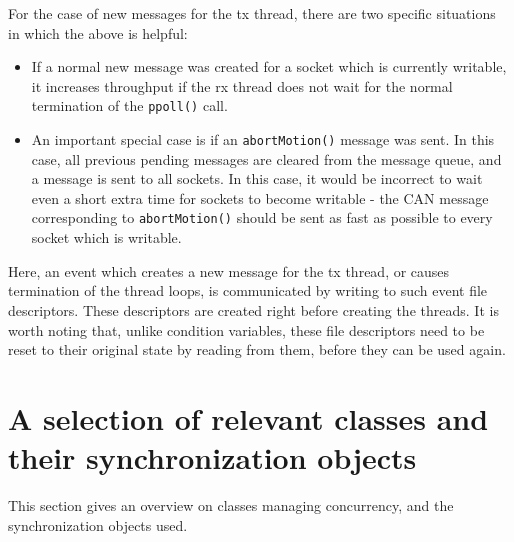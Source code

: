\documentclass[fontsize=12,a4paper]{scrartcl}
\begin{document}
For the case of new messages for the tx thread, there are two specific
situations in which the above is helpful:

\begin{itemize}
\item If a normal new message was created for a socket which is
  currently writable, it increases throughput if the rx thread does
  not wait for the normal termination of the \texttt{ppoll()} call.
  
\item An important special case is if an \texttt{abortMotion()}
  message was sent. In this case, all previous pending messages are
  cleared from the message queue, and a message is sent to all
  sockets. In this case, it would be incorrect to wait even a short
  extra time for sockets to become writable - the CAN message
  corresponding to \texttt{abortMotion()} should be sent as fast as
  possible to every socket which is writable.
  
\end{itemize}

Here, an event which creates a new message for the tx thread, or
causes termination of the thread loops, is communicated by writing to
such event file descriptors. These descriptors are created right
before creating the threads. It is worth noting that, unlike condition
variables, these file descriptors need to be reset to their original
state by reading from them, before they can be used again.

\section{A selection of relevant classes and their synchronization objects}

This section gives an overview on classes managing concurrency, and
the synchronization objects used.
\end{document}
